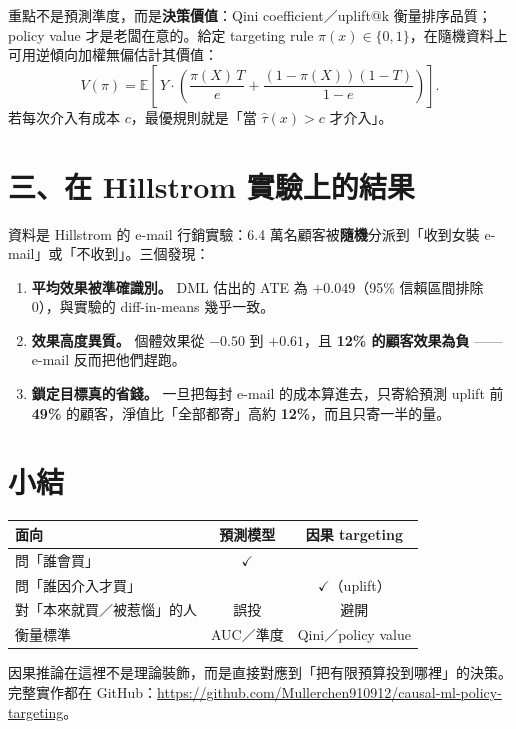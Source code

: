 \documentclass[12pt, a4paper]{article}
\begin{document}
重點不是預測準度，而是\textbf{決策價值}：Qini coefficient／uplift@k 衡量排序品質；policy value 才是老闆在意的。給定 targeting rule $\pi(x)\in\{0,1\}$，在隨機資料上可用逆傾向加權無偏估計其價值：
$$V(\pi) = \mathbb{E}\!\left[\,Y \cdot \left( \frac{\pi(X)\,T}{e} + \frac{(1-\pi(X))(1-T)}{1-e} \right)\right].$$
若每次介入有成本 $c$，最優規則就是「當 $\hat\tau(x) > c$ 才介入」。

\section{三、在 Hillstrom 實驗上的結果}

資料是 Hillstrom 的 e-mail 行銷實驗：6.4 萬名顧客被\textbf{隨機}分派到「收到女裝 e-mail」或「不收到」。三個發現：

\begin{enumerate}
  \item \textbf{平均效果被準確識別。} DML 估出的 ATE 為 $+0.049$（95\% 信賴區間排除 0），與實驗的 diff-in-means 幾乎一致。
  \item \textbf{效果高度異質。} 個體效果從 $-0.50$ 到 $+0.61$，且 \textbf{12\% 的顧客效果為負} —— e-mail 反而把他們趕跑。
  \item \textbf{鎖定目標真的省錢。} 一旦把每封 e-mail 的成本算進去，只寄給預測 uplift 前 \textbf{49\%} 的顧客，淨值比「全部都寄」高約 \textbf{12\%}，而且只寄一半的量。
\end{enumerate}

\section{小結}

\begin{center}
\begin{tabular}{lcc}
\toprule
面向 & 預測模型 & 因果 targeting \\
\midrule
問「誰會買」 & $\checkmark$ & \\
問「誰因介入才買」 & & $\checkmark$（uplift）\\
對「本來就買／被惹惱」的人 & 誤投 & 避開 \\
衡量標準 & AUC／準度 & Qini／policy value \\
\bottomrule
\end{tabular}
\end{center}

因果推論在這裡不是理論裝飾，而是直接對應到「把有限預算投到哪裡」的決策。完整實作都在 GitHub：\url{https://github.com/Mullerchen910912/causal-ml-policy-targeting}。
\end{document}
